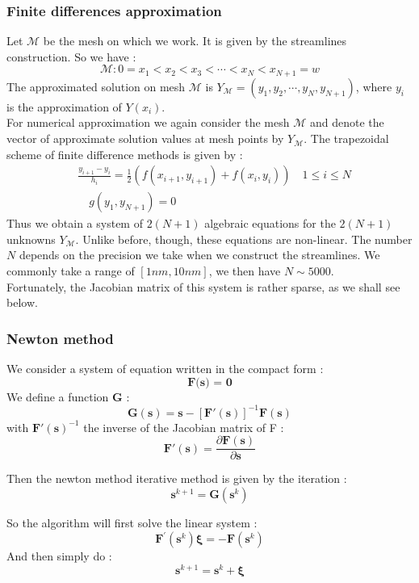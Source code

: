 \documentclass[11pt,a4paper,twocolumn]{article}
\begin{document}
\subsubsection{Finite differences approximation}
Let $\mathcal{M}$ be the mesh on which we work. It is given by the streamlines construction. So we have : 
\[\mathcal{M}: 0 = x_1 < x_2 < x_3 < \cdots < x_N < x_{N+1} = w \]
The approximated solution on mesh $\mathcal{M}$ is $Y_{\mathcal{M}} = (y_1, y_2, \cdots, y_N, y_{N+1})$, where $y_i$ is the approximation of $Y(x_i)$.\\
For numerical approximation we again consider the mesh $\mathcal{M}$ and denote the vector of approximate solution values at mesh points by $Y_{\mathcal{M}}$. The trapezoidal scheme of finite difference methods is given by : 
\begin{align}\label{TrapezScheme}
&\frac{y_{i+1}-y_{i}}{h_{i}}=\frac{1}{2}\left(f\left(x_{i+1}, y_{i+1}\right)+f\left(x_{i}, y_{i}\right)\right) \quad 1 \leq i \leq N \\
&\quad g\left(y_{1}, y_{N+1}\right)=0
\end{align}
Thus we obtain a system of $2(N +1)$ algebraic equations for the $2(N +1)$ unknowns $Y_{\mathcal{M}}$. Unlike before, though, these equations are non-linear. The number $N$ depends on the precision we take when we construct the streamlines. We commonly take a range of $\left[1nm, 10nm\right]$, we then have $N \sim 5000$. \\
Fortunately, the Jacobian matrix of this system is rather sparse, as we shall see below.

\subsubsection{Newton method}
We consider a system of equation written in the compact form : \[ \textbf{F(s) = 0} \]
We define a function \textbf{G} : 
\[  \textbf{G}(\textbf{s}) = \textbf{s} - \left[\textbf{F}'(\textbf{s}) \right]^{-1} \textbf{F}(\textbf{s})\]
with $\textbf{F}'(\textbf{s})^{-1} $ the inverse of the Jacobian matrix of F : 
\[\textbf{F}'(\textbf{s}) = \frac{\partial\textbf{F}(\textbf{s}) }{\partial \textbf{s}}  \]

Then the newton method iterative method is given by the iteration : 
\[\textbf{s}^{k+1} =  \textbf{G}(\textbf{s}^k) \]

So the algorithm will first solve the linear system : 
\begin{equation}
\mathbf{F}^{\prime}\left(\mathbf{s}^{k}\right) \boldsymbol{\xi}=-\mathbf{F}\left(\mathbf{s}^{k}\right)
\end{equation} 
And then simply do : 
\begin{equation}
\textbf{s}^{k+1} = \textbf{s}^{k} + \boldsymbol{\xi}
\end{equation} 
\end{document}

